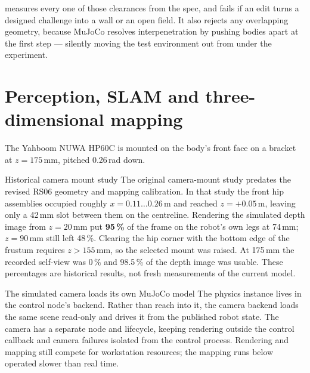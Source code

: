 \documentclass[11pt,a4paper]{article}
\begin{document}
 measures every one of those clearances from the spec, and
 fails if an edit turns a designed challenge into a wall or
an open field. It also rejects any overlapping geometry, because MuJoCo resolves
interpenetration by pushing bodies apart at the first step --- silently moving
the test environment out from under the experiment.

\section{Perception, SLAM and three-dimensional mapping}


The Yahboom NUWA HP60C is mounted on the body's front face on a bracket at
$z = 175$\,mm, pitched 0.26\,rad down.

\begin{decision}{Historical camera mount study}
The original camera-mount study predates the revised RS06 geometry and mapping
calibration. In that study the front hip assemblies occupied roughly
$x = 0.11 \ldots 0.26$\,m and reached
$z = +0.05$\,m, leaving only a 42\,mm slot between them on the centreline.
Rendering the simulated depth image from $z = 20$\,mm put \textbf{95\,\%} of the
frame on the robot's own legs at 74\,mm; $z = 90$\,mm still left 48\,\%. Clearing
the hip corner with the bottom edge of the frustum requires $z > 155$\,mm, so
the selected mount was raised. At 175\,mm the recorded self-view was
0\,\% and 98.5\,\% of the depth image was usable. These percentages are
historical results, not fresh measurements of the current model.
\end{decision}

\begin{decision}{The simulated camera loads its own MuJoCo model}
The physics instance lives in the control node's backend. Rather than reach into
it, the camera backend loads the same scene read-only and drives it from the
published robot state. The camera has a separate node and lifecycle, keeping
rendering outside the control callback and camera failures isolated from the
control process. Rendering and mapping still compete for workstation resources;
the mapping runs below operated slower than real time.
\end{decision}
\end{document}
